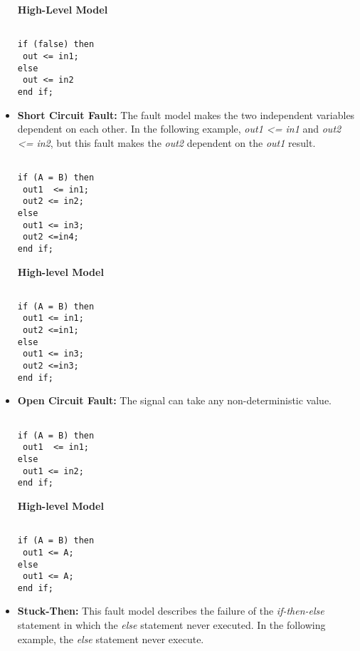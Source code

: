 \begin{itemize}
\textbf{High-Level Model}

\begin{lstlisting}[frame=single]  % Start your code-block

if (false) then 
 out <= in1;
else
 out <= in2
end if;
\end{lstlisting}


\item \textbf{Short Circuit Fault:} The fault model makes the two independent variables dependent on each other. In the following example, \textit{out1 <= in1} and \textit{out2 <= in2}, but this fault makes the \textit{out2} dependent on the \textit{out1} result.


\begin{lstlisting}[frame=single]  % Start your code-block

if (A = B) then 
 out1  <= in1;
 out2 <= in2;
else
 out1 <= in3;
 out2 <=in4;
end if;
\end{lstlisting}


\textbf{High-level Model}
\begin{lstlisting}[frame=single]  % Start your code-block

if (A = B) then 
 out1 <= in1;
 out2 <=in1;
else
 out1 <= in3;
 out2 <=in3;
end if;
\end{lstlisting}




\item \textbf{Open Circuit Fault:} The signal can take any non-deterministic value.



\begin{lstlisting}[frame=single]  % Start your code-block

if (A = B) then 
 out1  <= in1;
else
 out1 <= in2;
end if;
\end{lstlisting}


\textbf{High-level Model}
\begin{lstlisting}[frame=single]  % Start your code-block

if (A = B) then 
 out1 <= A;
else
 out1 <= A;
end if;
\end{lstlisting}


\item \textbf{Stuck-Then:} This fault model describes the failure of the \textit{if-then-else} statement in which the \textit{else}
 statement never executed. In the following example, the \textit{else }
statement never execute.

\begin{lstlisting}[frame=single]  % Start your code-block


\end{lstlisting}
\end{itemize}
